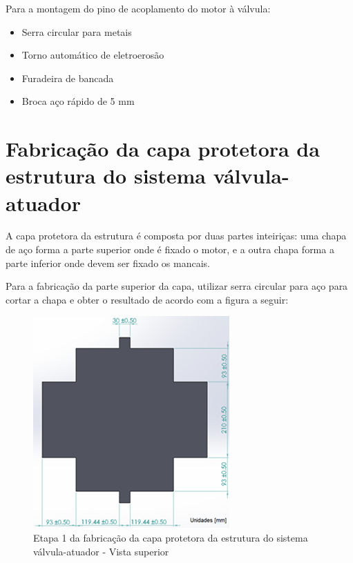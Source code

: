         \par Para a montagem do pino de acoplamento do motor à válvula:
    \begin{itemize}
        \item Serra circular para metais
        \item Torno automático de eletroerosão
        \item Furadeira de bancada 
        \item Broca aço rápido de 5 mm
    \end{itemize}

\section{Fabricação da capa protetora da estrutura do sistema válvula-atuador}
A capa protetora da estrutura é composta por duas partes inteiriças: uma chapa de aço forma a parte superior onde é fixado o motor, e a outra chapa forma a parte inferior onde devem ser fixado os mancais.

Para a fabricação da parte superior da capa, utilizar serra circular para aço para cortar a chapa e obter o resultado de acordo com a figura a seguir:
\begin{figure} [H]
    \centering
    \includegraphics[width=.5\textwidth]{Figuras/montagemAbastecimento/capa/etapa1.png}
    \caption{Etapa 1 da fabricação da capa protetora da estrutura do sistema válvula-atuador - Vista superior}
    \label{fig:etapa1}
\end{figure}

